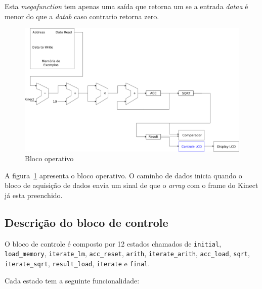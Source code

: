 \documentclass[12pt]{article}
\begin{document}
Esta \textit{megafunction} tem apenas uma saída que retorna um se a entrada
\textit{dataa} é menor do que a \textit{datab} caso contrario retorna zero.

\begin{figure}[h]
\centering
\includegraphics[width=.7\textwidth]{../apresentacao/knn_sem_controle}
\caption{Bloco operativo}
\label{fig:blocoperativo}
\end{figure}

A figura~\ref{fig:blocoperativo} apresenta o bloco operativo. O caminho de
dados inicia quando o bloco de aquisição de dados envia um sinal de que o 
\textit{array} com o frame do Kinect já esta preenchido.


\subsection{Descrição do bloco de controle}

O bloco de controle é composto por 12 estados chamados de \verb|initial|,
\verb|load_memory|, \verb|iterate_lm|, \verb|acc_reset|,
\verb|arith|, \verb|iterate_arith|, \verb|acc_load|, \verb|sqrt|,
\verb|iterate_sqrt|, \verb|result_load|, \verb|iterate| e 
\verb|final|.

Cada estado tem a seguinte funcionalidade:
\end{document}
